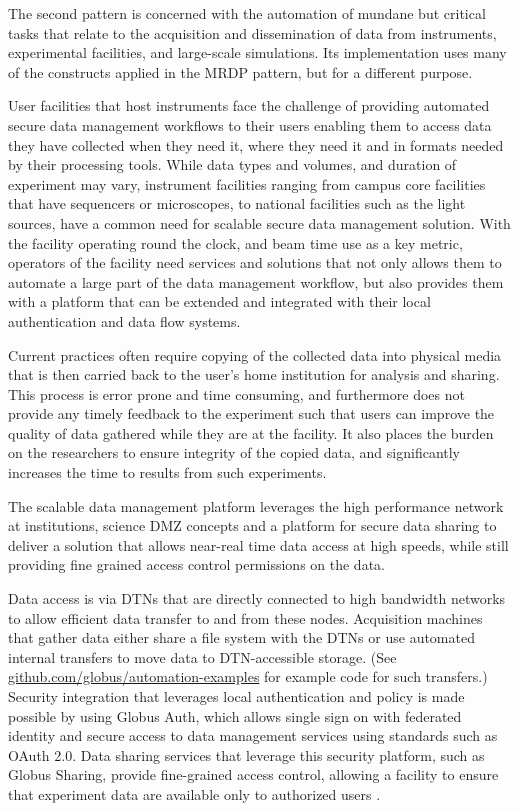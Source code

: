 \documentclass[10pt]{article}
\begin{document}
The second pattern is concerned with 
the automation of mundane but critical tasks that relate to the acquisition 
and dissemination of data from instruments, experimental facilities, and large-scale simulations.
Its implementation uses many of the constructs applied in the MRDP pattern, but for a different purpose. 

User facilities that host instruments face the challenge of providing automated secure data management workflows to their users enabling them to access data they have collected when they need it, where they need it and in formats needed by their processing tools. 
While data types and volumes, and duration of experiment may vary, instrument facilities ranging from campus core facilities that have sequencers or microscopes, to national facilities such as the light sources, have a common need for scalable secure data management solution. 
With the facility operating round the clock, and beam time use as a key metric, operators of the facility need services and solutions that not only allows them to automate a large part of the data management workflow, but also provides them with a platform that can be extended and integrated with their local authentication and data flow systems.

Current practices often require copying of the collected data into physical media that is then carried back to the user's home institution for analysis and sharing. 
This process is error prone and time consuming, and furthermore does not provide any timely feedback to the experiment such that users can improve the quality of data gathered while they are at the facility. 
It also places the burden on the researchers to ensure integrity of the copied data, 
and significantly increases the time to results from such experiments.

The scalable data management platform leverages the high performance network at institutions, 
science DMZ concepts and a platform for secure data sharing to deliver a solution that allows near-real time data access at high speeds, 
while still providing fine grained access control permissions on the data. 

Data access is via DTNs that are directly connected to high bandwidth networks to allow efficient data transfer to and from these nodes. 
Acquisition machines that gather data either share a file system with the DTNs or use automated internal transfers to move data to DTN-accessible storage.
(See \url{github.com/globus/automation-examples} for example code for such transfers.)
Security integration that leverages local authentication and policy is made possible by using Globus Auth, which allows single sign on with federated identity and secure access to data management services using standards such as OAuth 2.0. 
Data sharing services that leverage this security platform,
such as Globus Sharing,
provide fine-grained access control, 
allowing a facility to ensure that experiment data are available only to authorized users . 
\end{document}
